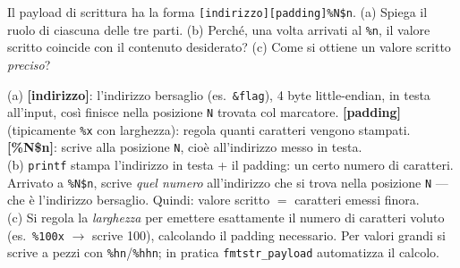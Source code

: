 \question[6]
Il payload di scrittura ha la forma \lstinline|[indirizzo][padding]%N$n|. (a) Spiega il ruolo di ciascuna delle tre parti. (b) Perché, una volta arrivati al \lstinline|%n|, il valore scritto coincide con il contenuto desiderato? (c) Come si ottiene un valore scritto \emph{preciso}?
\begin{solution}
(a) \textbf{[indirizzo]}: l'indirizzo bersaglio (es.\ \lstinline|&flag|), 4 byte little-endian, in testa all'input, così finisce nella posizione \lstinline|N| trovata col marcatore. \textbf{[padding]} (tipicamente \lstinline|%x| con larghezza): regola quanti caratteri vengono stampati. \textbf{[\%N\$n]}: scrive alla posizione \lstinline|N|, cioè all'indirizzo messo in testa.\\
(b) \lstinline|printf| stampa l'indirizzo in testa + il padding: un certo numero di caratteri. Arrivato a \lstinline|%N$n|, scrive \emph{quel numero} all'indirizzo che si trova nella posizione \lstinline|N| --- che è l'indirizzo bersaglio. Quindi: valore scritto $=$ caratteri emessi finora.\\
(c) Si regola la \emph{larghezza} per emettere esattamente il numero di caratteri voluto (es.\ \lstinline|%100x| $\to$ scrive 100), calcolando il padding necessario. Per valori grandi si scrive a pezzi con \lstinline|%hn|/\lstinline|%hhn|; in pratica \lstinline|fmtstr_payload| automatizza il calcolo.
\end{solution}

